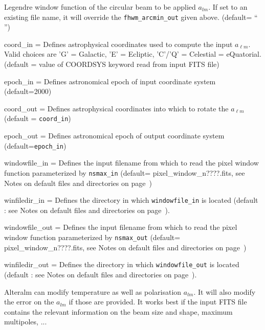 \begin{qualifiers}
\begin{qulist}{}
      Legendre window function of the circular beam to be applied $a_{lm}$. If
      set to an existing file name, it will override the 
    {\tt fhwm\_arcmin\_out} given above. (default= `` '')
    \item[{coord\_in = }]%
 Defines astrophysical coordinates used to compute the
    input $a_{\ell m}$. Valid choices are 'G' = Galactic, 'E' = Ecliptic, 
    'C'/'Q' = Celestial = eQuatorial. (default = value of COORDSYS keyword read
    from input FITS file)
    \item[{epoch\_in = }]%
 Defines astronomical epoch of input coordinate system (default=2000)
    \item[{coord\_out = }]%
 Defines astrophysical coordinates into which to rotate
    the $a_{\ell m}$ (default = {\tt coord\_in})
    \item[{epoch\_out = }]%
 Defines astronomical epoch of output coordinate system
    (default={\tt epoch\_in})
     \item[{windowfile\_in = }]%
	Defines the input filename from which to read the pixel window function parameterized by {\tt nsmax\_in}
(default= pixel\_window\_n????.fits, see Notes on default files and directories on page~\pageref{page:defdir})
     \item[{winfiledir\_in = }]%
	Defines the directory in which {\tt windowfile\_in}
    is located (default : see Notes on default files and directories on page~\pageref{page:defdir}).
     \item[{windowfile\_out = }]%
	Defines the input filename from which to read the pixel window function parameterized by {\tt nsmax\_out}
(default= pixel\_window\_n????.fits, see Notes on default files and directories on page~\pageref{page:defdir})
     \item[{winfiledir\_out = }]%
	Defines the directory in which {\tt windowfile\_out}
    is located (default : see Notes on default files and directories on page~\pageref{page:defdir}).

  \end{qulist}
\end{qualifiers}

\begin{codedescription}
{%
Alteralm can modify temperature as well as polarisation $a_{lm}$. It will also
modify the error on the $a_{lm}$ if those are provided. It works best if the
input FITS file contains the relevant information on the beam size and shape,
maximum multipoles, ...
}
\end{codedescription}

